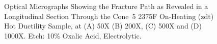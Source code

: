 \begin{figure}
\ContinuedFloat
\centering
{}

\caption[Optical Micrographs Showing the Fracture Path as Revealed in a Longitudinal Section Through the Cone~5 2375\textdegree{}F On-Heating Hot Ductility Sample.]{Optical Micrographs Showing the Fracture Path as Revealed in a Longitudinal Section Through the Cone~5 2375\textdegree{}F On-Heating (\gls{zdt}) Hot Ductility Sample, at (A) 50X (B) 200X, (C) 500X and (D) 1000X.  Etch: 10\% Oxalic Acid, Electrolytic.}

\end{figure}


